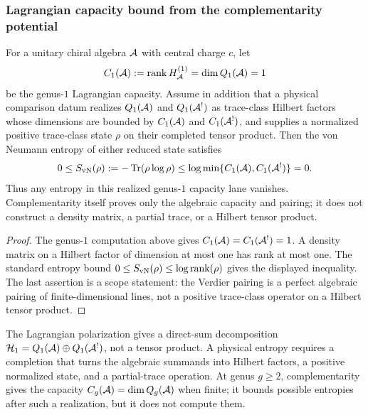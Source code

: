 \subsubsection{Lagrangian capacity bound from the complementarity
potential}

\begin{proposition}
For a unitary chiral algebra $\mathcal{A}$ with central charge $c$,
let
\begin{equation}%
C_1(\cA) := \rank H_\cA^{(1)}=\dim Q_1(\cA)=1
\end{equation}
be the genus-$1$ Lagrangian capacity.  Assume in addition that a
physical comparison datum realizes \(Q_1(\mathcal{A})\) and \(Q_1(\mathcal{A}^!)\) as
trace-class Hilbert factors whose dimensions are bounded by
\(C_1(\mathcal{A})\) and \(C_1(\mathcal{A}^!)\), and supplies a normalized positive
trace-class state \(\rho\) on their completed tensor product.  Then
the von Neumann entropy of either reduced state satisfies
\begin{equation}%
0 \leq S_{\mathrm{vN}}(\rho)
:= -\Tr(\rho\log\rho)
\leq \log \min\{C_1(\cA),C_1(\cA^!)\}
=0.
\end{equation}
Thus any entropy in this realized genus-$1$ capacity lane vanishes.
Complementarity itself proves only the algebraic capacity and
pairing; it does not construct a density matrix, a partial trace, or a
Hilbert tensor product.
\end{proposition}

\begin{proof}
The genus-$1$ computation above gives
\(C_1(\mathcal{A})=C_1(\mathcal{A}^!)=1\).  A density matrix on a Hilbert factor of
dimension at most one has rank at most one.  The standard entropy
bound \(0\leq S_{\mathrm{vN}}(\rho)\leq \log \operatorname{rank}(\rho)\) gives the
displayed inequality.  The last assertion is a scope statement: the
Verdier pairing is a perfect algebraic pairing of finite-dimensional
lines, not a positive trace-class operator on a Hilbert tensor
product.
\end{proof}

\begin{remark}[Scope]
The Lagrangian polarization gives a direct-sum decomposition
\(\mathcal{H}_1 = Q_1(\mathcal{A})\oplus Q_1(\mathcal{A}^!)\), not a tensor product.
A physical entropy requires a completion that turns the algebraic
summands into Hilbert factors, a positive normalized state, and a
partial-trace operation.  At genus \(g\ge2\), complementarity gives the
capacity \(C_g(\mathcal{A})=\dim Q_g(\mathcal{A})\) when finite; it bounds possible
entropies after such a realization, but it does not compute them.
\end{remark}


